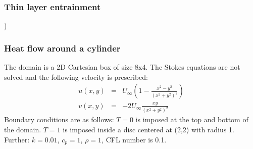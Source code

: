 \subsubsection{Thin layer entrainment} \label{sec:tlentr})




\subsubsection{Heat flow around a cylinder} \label{sec:hfcyl}

The domain is a 2D Cartesian box of size 8x4.
The Stokes equations are not solved and the following velocity is prescribed:
\begin{eqnarray}
u(x,y)&=& U_\infty \left(  1-\frac{x^2-y^2}{(x^2+y^2)^2}  \right) \\
v(x,y)&=& -2U_\infty \frac{xy}{(x^2+y^2)^2}
\end{eqnarray}
Boundary conditions are as follows:
$T=0$ is imposed at the top and bottom of the domain. 
$T=1$ is imposed inside a disc centered at (2,2) with radius 1.  
Further: $k=0.01$, $c_p=1$, $\rho=1$, CFL number is 0.1.

